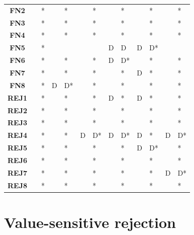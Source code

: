 \begin{table}
\begin{tabularx}{\textwidth}{ c YYYYYYYYYYYY}
        \textbf{FN2} &  & * &  & * &  & * &  & * &  & * &  & * \\
        \textbf{FN3} &  & * &  & * &  & * &  & * &  & * &  & * \\
        \textbf{FN4} &  & * &  & * &  & * &  & * &  & * &  & * \\
        \textbf{FN5} &  & * &  &  &  &  & D & D & D & D* &  &  \\
        \textbf{FN6} &  & * &  & * &  & * & D & D* &  & * &  & * \\
        \textbf{FN7} &  & * &  & * &  & * &  & * & D & * &  & * \\
        \textbf{FN8} &  & * & D & D* &  & * &  & * &  & * &  & * \\
        \textbf{REJ1} &  & * &  & * &  & * & D & * & D & * &  & * \\
        \textbf{REJ2} &  & * &  & * &  & * &  & * &  & * &  & * \\
        \textbf{REJ3} &  & * &  & * &  & * &  & * &  & * &  & * \\
        \textbf{REJ4} &  & * &  & * & D & D* & D & D* & D & * & D & D* \\
        \textbf{REJ5} &  & * &  & * &  & * &  & * & D & D* &  & * \\
        \textbf{REJ6} &  & * &  & * &  & * &  & * &  & * &  & * \\
        \textbf{REJ7} &  & * &  & * &  & * &  & * &  & * & D & D* \\
        \textbf{REJ8} &  & * &  & * &  & * &  & * &  & * &  & * \\

        \bottomrule
    \end{tabularx}
\end{table}

\section{Value-sensitive rejection}
\label{sec:results-rejector}
